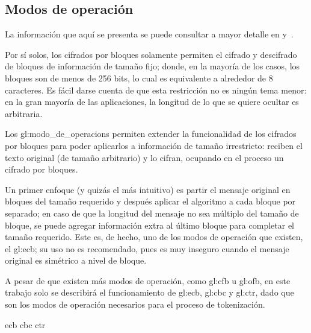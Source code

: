 %
%

\subsection{Modos de operación}
\label{sec:modos}

La información que aquí se presenta se puede consultar a mayor detalle en
\cite{modos_de_operacion} y~\cite{menezes}.

Por sí solos, los cifrados por bloques solamente permiten el cifrado y
descifrado de bloques de información de tamaño fijo; donde, en la mayoría de
los casos, los bloques son de menos de 256 bits, lo cual es equivalente a
alrededor de 8 caracteres. Es fácil darse cuenta de que esta restricción no es
ningún tema menor: en la gran mayoría de las aplicaciones, la longitud de lo
que se quiere ocultar es arbitraria.

Los \glspl{gl:modo_de_operacion} permiten extender la funcionalidad de los
cifrados por bloques para poder aplicarlos a información de tamaño irrestricto:
reciben el texto original (de tamaño arbitrario) y lo cifran, ocupando en el
proceso un cifrado por bloques.

Un primer enfoque (y quizás el más intuitivo) es partir el mensaje original
en bloques del tamaño requerido y después aplicar el algoritmo a cada bloque
por separado; en caso de que la longitud del mensaje no sea múltiplo del
tamaño de bloque, se puede agregar información extra al último bloque para
completar el tamaño requerido. Este es, de hecho, uno de los modos de operación
que existen, el \gls{gl:ecb}; su uso no es recomendado, pues es muy inseguro
cuando el mensaje original es simétrico a nivel de bloque.

A pesar de que existen más modos de operación, como \gls{gl:cfb}
u \gls{gl:ofb}, en este trabajo solo se describirá el funcionamiento de
\gls{gl:ecb}, \gls{gl:cbc} y \gls{gl:ctr}, dado que son los modos de operación
necesarios para el proceso de tokenización.



{ecb}
{cbc}
{ctr}
